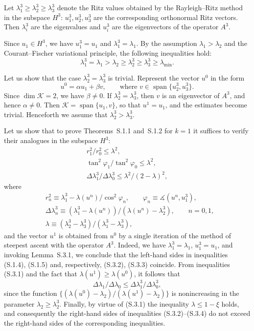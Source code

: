 \documentclass[11pt,oneside]{book}
\newcommand{\myspan}{\operatorname{span}}
\newcommand{\ang}{\measuredangle}
\begin{document}
Let $\lambda_1^3 \geqslant \lambda_2^3 \geqslant \lambda_3^3$ denote the Ritz values obtained by the Rayleigh--Ritz method in the subspace $H^3$: $u_1^3, u_2^3, u_3^3$ are the corresponding orthonormal Ritz vectors. Then $\lambda_i^3$ are the eigenvalues and $u_i^3$ are the eigenvectors of the operator $A^3$.

Since $u_1 \in H^3$, we have $u_1^3 = u_1$ and $\lambda_1^3 = \lambda_1$. By the assumption $\lambda_1 > \lambda_2$ and the Courant--Fischer variational principle, the following inequalities hold:
\[
\lambda_1^3 = \lambda_1 > \lambda_2 \geqslant \lambda_2^3 \geqslant \lambda_3^3 \geqslant \lambda_{\min}. \tag{S.3.1}
\]

Let us show that the case $\lambda_2^3 = \lambda_3^3$ is trivial. Represent the vector $u^0$ in the form
\[
u^0 = \alpha u_1 + \beta v, \qquad \text{where } v \in \myspan\{u_2^3, u_3^3\}.
\]
Since $\dim \mathcal{K} = 2$, we have $\beta \neq 0$. If $\lambda_2^3 = \lambda_3^3$, then $v$ is an eigenvector of $A^3$, and hence $\alpha \neq 0$. Then $\mathcal{K} = \myspan\{u_1, v\}$, so that $u^1 = u_1$, and the estimates become trivial. Henceforth we assume that $\lambda_2^3 > \lambda_3^3$.

Let us show that to prove Theorems~S.1.1 and~S.1.2 for $k = 1$ it suffices to verify their analogues in the subspace $H^3$:
\begin{gather*}
r_1^2 / r_0^2 \leqslant \lambda^2, \tag{S.3.2} \\
\tan^2 \varphi_1 / \tan^2 \varphi_0 \leqslant \lambda^2, \tag{S.3.3} \\
\Delta\lambda_1^3 / \Delta\lambda_0^3 \leqslant \lambda^2 / (2 - \lambda)^2, \tag{S.3.4}
\end{gather*}
where
\begin{align*}
&r_n^2 \equiv \lambda_1^3 - \lambda(u^n) / \cos^2 \varphi_n, \qquad \varphi_n \equiv \ang(u^n, u_1^3), \\ %
&\Delta\lambda_n^3 \equiv (\lambda_1^3 - \lambda(u^n)) / (\lambda(u^n) - \lambda_2^3), \qquad n = 0, 1, \\
&\lambda \equiv (\lambda_2^3 - \lambda_3^3) / (\lambda_1^3 - \lambda_3^3),
\end{align*}
and the vector $u^1$ is obtained from $u^0$ by a single iteration of the method of steepest ascent with the operator $A^3$. Indeed, we have $\lambda_1^3 = \lambda_1$, $u_1^3 = u_1$, and invoking Lemma~S.3.1, we conclude that the left-hand sides in inequalities (S.1.4), (S.1.5) and, respectively, (S.3.2), (S.3.3) coincide. From inequalities (S.3.1) and the fact that $\lambda(u^1) \geqslant \lambda(u^0)$, it follows that
\[
\Delta\lambda_1 / \Delta\lambda_0 \leqslant \Delta\lambda_1^3 / \Delta\lambda_0^3,
\]
since the function $\{(\lambda(u^0) - \lambda_2) / (\lambda(u^1) - \lambda_2)\}$ is nonincreasing in the parameter $\lambda_2 \geqslant \lambda_2^3$. Finally, by virtue of (S.3.1) the inequality $\lambda \leqslant 1 - \xi$ holds, and consequently the right-hand sides of inequalities (S.3.2)--(S.3.4) do not exceed the right-hand sides of the corresponding inequalities.
\end{document}
